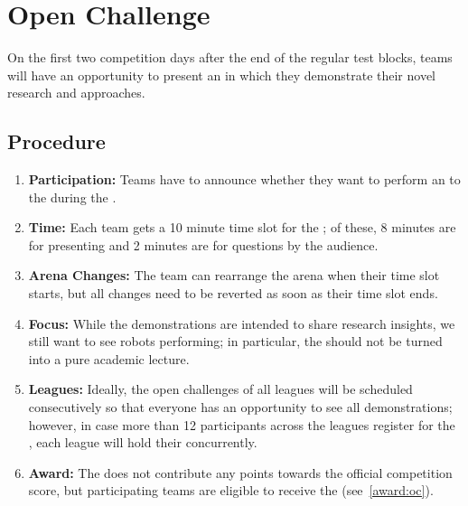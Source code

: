 \section{Open Challenge}\label{sec:rules:openchallenge}

On the first two competition days after the end of the regular test blocks, teams will have an opportunity to present an \OpenChallenge{} in which they demonstrate their novel research and approaches.

\subsection{Procedure}\label{sec:rules:ocprocedure}
\begin{enumerate}
	\item \textbf{Participation:} Teams have to announce whether they want to perform an \OpenChallenge{} to the  during the \SetupDays{}.
	\item \textbf{Time:} Each team gets a 10 minute time slot for the \OpenChallenge; of these, 8 minutes are for presenting and 2 minutes are for questions by the audience.
	\item \textbf{Arena Changes:} The team can rearrange the arena when their time slot starts, but all changes need to be reverted as soon as their time slot ends.
	\item \textbf{Focus:} While the demonstrations are intended to share research insights, we still want to see robots performing; in particular, the \OpenChallenge{} should not be turned into a pure academic lecture.
	\item \textbf{Leagues:} Ideally, the open challenges of all \AtHome{} leagues will be scheduled consecutively so that everyone has an opportunity to see all demonstrations; however, in case more than 12 participants across the leagues register for the \OpenChallenge, each league will hold their \OpenChallenge{} concurrently.
	\item \textbf{Award:} The \OpenChallenge{} does not contribute any points towards the official competition score, but participating teams are eligible to receive the \OCAward{} (see~\ref{award:oc}).
\end{enumerate}
